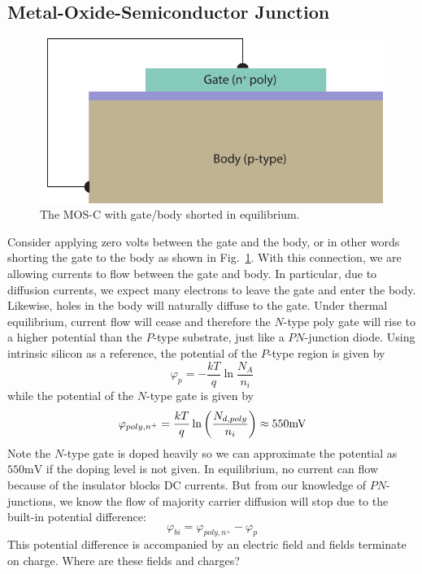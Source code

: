 \subsection{Metal-Oxide-Semiconductor Junction}
\begin{figure}[tbh]
\centering
\includegraphics[width=.75\columnwidth]{mos_cap_wire_short}
\caption{The MOS-C with gate/body shorted in equilibrium. }
\label{fig:mos_cap_gate_body_short}
\end{figure}
Consider applying zero volts between the gate and the body, or in other words shorting the gate to the body as shown in Fig.~\ref{fig:mos_cap_gate_body_short}.   With this connection, we are allowing currents to flow between the gate and body.  In particular, due to diffusion currents, we expect many electrons to leave the gate and enter the body. Likewise, holes in the body will naturally diffuse to the gate.  Under thermal equilibrium, current flow will cease and therefore the $N$-type poly gate will rise to a higher potential than the $P$-type substrate, just like a $PN$-junction diode.  Using intrinsic silicon as a reference, the potential of the $P$-type region is given by
    \begin{equation}
        {\varphi _p} =  - \frac{{kT}}{q}\ln \frac{{{N_A}}}{{{n_i}}}
    \end{equation}
while the potential of the $N$-type gate is given by
    \begin{equation}
        {\varphi _{poly,{n^ + }}} = \frac{{kT}}{q}\ln \left( {\frac{{{N_{d,poly}}}}{{{n_i}}}} \right) 
    \approx 550{\rm{mV}}
\end{equation}
Note the $N$-type gate is doped heavily so we can approximate the potential as $550\mathrm{mV}$ if the doping level is not given.  In equilibrium, no current can flow because of the insulator blocks DC currents.  But from our knowledge of $PN$-junctions, we know the flow of majority carrier diffusion will stop due to the built-in potential difference:
    \begin{equation}
        \varphi_{bi} = {\varphi _{poly,{n^ + }}}  - {\varphi _p} 
    \end{equation}
This potential difference is accompanied by an electric field and fields terminate on charge.  Where are these fields and charges?

